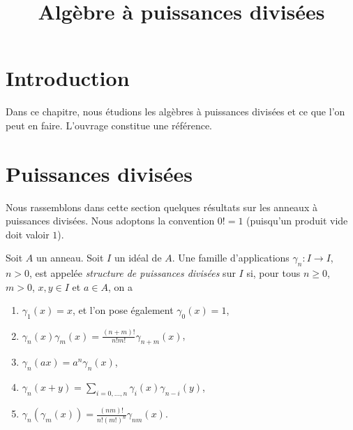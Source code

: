 

%


\title{Algèbre à puissances divisées}


\maketitle

\label{section-phantom}

\tableofcontents

\section{Introduction}
\label{section-introduction}

\noindent
Dans ce chapitre, nous étudions les algèbres à puissances divisées et ce que
l'on peut en faire. L'ouvrage \cite{Berthelot} constitue une référence.





\section{Puissances divisées}
\label{section-divided-powers}

\noindent
Nous rassemblons dans cette section quelques résultats sur les anneaux à
puissances divisées. Nous adoptons la convention $0! = 1$ (puisqu'un produit
vide doit valoir $1$).

\begin{definition}
\label{definition-divided-powers}
Soit $A$ un anneau. Soit $I$ un idéal de $A$. Une famille d'applications
$\gamma_n : I \to I$, $n > 0$, est appelée {\it structure de puissances divisées}
sur $I$ si, pour tous $n \geq 0$, $m > 0$, $x, y \in I$ et $a \in A$, on a
\begin{enumerate}
\item $\gamma_1(x) = x$, et l'on pose également $\gamma_0(x) = 1$,
\item $\gamma_n(x)\gamma_m(x) = \frac{(n + m)!}{n! m!} \gamma_{n + m}(x)$,
\item $\gamma_n(ax) = a^n \gamma_n(x)$,
\item $\gamma_n(x + y) = \sum_{i = 0, \ldots, n} \gamma_i(x)\gamma_{n - i}(y)$,
\item $\gamma_n(\gamma_m(x)) = \frac{(nm)!}{n! (m!)^n} \gamma_{nm}(x)$.
\end{enumerate}
\end{definition}

